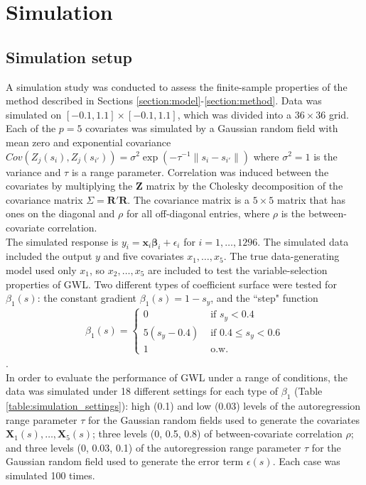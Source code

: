 \documentclass[authoryear, review, 11pt]{elsarticle}
\begin{document}
\section{Simulation}
	\subsection{Simulation setup}
	A simulation study was conducted to assess the finite-sample properties of the method described in Sections \ref{section:model}-\ref{section:method}. Data was simulated on $[-0.1,1.1] \times [-0.1,1.1]$, which was divided into a $36 \times 36$ grid. Each of the $p=5$ covariates was simulated by a Gaussian random field with mean zero and exponential covariance $Cov \left(Z_j(s_i), Z_j(s_{i'}) \right) = \sigma^2 \exp{\left( -\tau^{-1} \|s_i - s_{i'} \| \right)}$ where $\sigma^2=1$ is the variance and $\tau$ is a range parameter. Correlation was induced between the covariates by multiplying the $\bm{Z}$ matrix by the Cholesky decomposition of the covariance matrix $\Sigma = \bm{R}'\bm{R}$. The covariance matrix is a $5 \times 5$ matrix that has ones on the diagonal and $\rho$ for all off-diagonal entries, where $\rho$ is the between-covariate correlation.\\
		
	The simulated response is $y_i = \bm{x}_i \bm{\beta}_i + \epsilon_i$ for $i=1, \dots, 1296$. The simulated data included the output $y$ and five covariates $x_1, \dots, x_5$. The true data-generating model used only $x_1$, so $x_2, \dots, x_5$ are included to test the variable-selection properties of GWL. Two different types of coefficient surface were tested for $\beta_1(s)$: the constant gradient $\beta_1(s) = 1-s_y$, and the ``step" function
	\begin{eqnarray}
		\beta_1(s) = \begin{cases} 0 &\mbox{ if } s_y<0.4 \\ 5(s_y-0.4) &\mbox{ if } 0.4 \leq s_y<0.6 \\ 1 &\mbox{ o.w.} \end{cases}
	\end{eqnarray}.\\
		
	In order to evaluate the performance of GWL under a range of conditions, the data was simulated under 18 different settings for each type of $\beta_1$ (Table \ref{table:simulation_settings}): high (0.1) and low (0.03) levels of the autoregression range parameter $\tau$ for the Gaussian random fields used to generate the covariates $\bm{X}_1(s), \dots, \bm{X}_5(s)$; three levels (0, 0.5, 0.8) of between-covariate correlation $\rho$; and three levels (0, 0.03, 0.1) of the autoregression range parameter $\tau$ for the Gaussian random field used to generate the error term $\epsilon(s)$. Each case was simulated 100 times.\\
		
\end{document}
